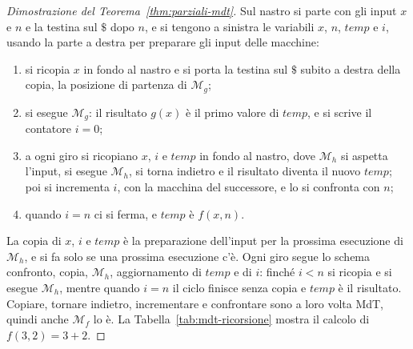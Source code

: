 \documentclass[a4paper, 11pt, oneside]{book}
\theoremstyle{formale}
\begin{document}
\begin{proof}[Dimostrazione del Teorema~\ref{thm:parziali-mdt}]
        Sul nastro si parte con gli input $x$ e $n$ e la testina sul $\$$ dopo $n$, e si
        tengono a sinistra le variabili $x$, $n$, $\mathit{temp}$ e $i$, usando la parte a
        destra per preparare gli input delle macchine:
        \begin{enumerate}
            \item si ricopia $x$ in fondo al nastro e si porta la testina sul $\$$ subito
                a destra della copia, la posizione di partenza di $\mathcal{M}_g$;
            \item si esegue $\mathcal{M}_g$: il risultato $g(x)$ \`e il primo valore di
                $\mathit{temp}$, e si scrive il contatore $i = 0$;
            \item a ogni giro si ricopiano $x$, $i$ e $\mathit{temp}$ in fondo al nastro,
                dove $\mathcal{M}_h$ si aspetta l'input, si esegue $\mathcal{M}_h$, si
                torna indietro e il risultato diventa il nuovo $\mathit{temp}$; poi si
                incrementa $i$, con la macchina del successore, e lo si confronta con
                $n$;
            \item quando $i = n$ ci si ferma, e $\mathit{temp}$ \`e $f(x, n)$.
        \end{enumerate}
        La copia di $x$, $i$ e $\mathit{temp}$ \`e la preparazione dell'input per la
        prossima esecuzione di $\mathcal{M}_h$, e si fa solo se una prossima esecuzione
        c'\`e. Ogni giro segue lo schema confronto, copia, $\mathcal{M}_h$, aggiornamento
        di $\mathit{temp}$ e di $i$: finch\'e $i < n$ si ricopia e si esegue
        $\mathcal{M}_h$, mentre quando $i = n$ il ciclo finisce senza copia e
        $\mathit{temp}$ \`e il risultato.
        Copiare, tornare indietro, incrementare e confrontare sono a loro volta MdT, quindi
        anche $\mathcal{M}_f$ lo \`e. La Tabella~\ref{tab:mdt-ricorsione} mostra il
        calcolo di $f(3, 2) = 3 + 2$.


\end{proof}
\end{document}
